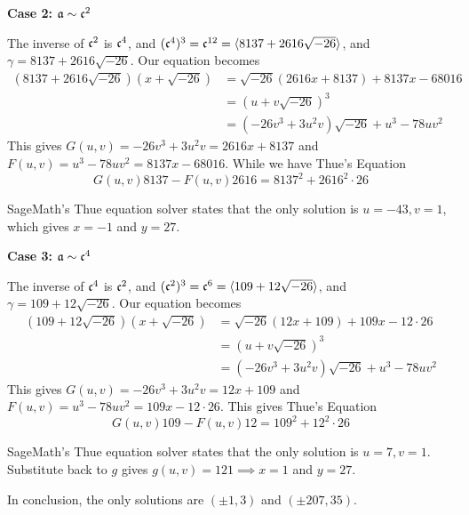 \textbf{Case 2: $\mathfrak{a} \sim \mathfrak{c}^2$}

The inverse of $\mathfrak{c}^2$ is $\mathfrak{c}^4$, and $(\mathfrak{c}^4)^3 = \mathfrak{c}^{12} = \langle 8137 + 2616 \sqrt{-26} \rangle$, and $\gamma = 8137 + 2616 \sqrt{-26}$.
Our equation becomes 
\begin{align*}
	(8137 + 2616 \sqrt{-26})(x + \sqrt{-26})  &= \sqrt{-26}(2616x + 8137)+ 8137 x - 68016\\
											  &= (u + v \sqrt{-2 6})^3\\
	&=  (-26v^3 + 3 u^2 v) \sqrt{-26} + u^3 - 78 uv^2 
\end{align*}
This gives 
$G(u, v) = -26v^3 + 3 u^2 v = 2616x +8137$ and $F(u, v) = u^3 - 78uv^2 = 8137x - 68016$.
While we have Thue's Equation 
$$
	G(u, v) 8137 - F(u, v) 2616 = 8137^2 + 2616 ^2 \cdot 26
$$

SageMath's Thue equation solver states that the only solution is
$u = -43, v  = 1$, which gives $x = -1$ and $y = 27$.

\textbf{Case 3: $\mathfrak{a} \sim \mathfrak{c}^4$}

The inverse of $\mathfrak{c}^4$ is $\mathfrak{c}^2$, and $(\mathfrak{c}^2)^3 = \mathfrak{c}^{6} = \langle 109 + 12 \sqrt{-26} \rangle$, and $\gamma = 109 + 12 \sqrt{-26}$.
Our equation becomes 
\begin{align*}
	(109 + 12 \sqrt{-26})(x + \sqrt{-26})  &= \sqrt{-26}(12 x + 109)+ 109 x - 12 \cdot 26\\
											  &= (u + v \sqrt{-2 6})^3\\
	&=  (-26v^3 + 3 u^2 v) \sqrt{-26} + u^3 - 78 uv^2 
\end{align*}
This gives 
$G(u, v) = -26v^3 + 3 u^2 v = 12 x  +109$ and $F(u, v) = u^3 - 78uv^2 = 109 x - 12 \cdot 26$.
This gives Thue's Equation 
$$
	G(u, v) 109 - F(u, v) 12 = 109^2 + 12 ^2 \cdot 26
$$

SageMath's Thue equation solver states that the only solution is 
$u = 7, v =1$. 
Substitute back to $g$ gives $g(u, v)=121 \implies x = 1$ and $y = 27$.


In conclusion, the only solutions are $(\pm 1, 3)$ and $(\pm 207, 35)$.
